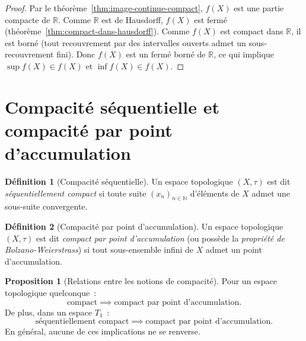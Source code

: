 \documentclass[12pt,a4paper,openany]{book}
\theoremstyle{definition}
\newtheorem{definition}{Définition}[chapter]
\theoremstyle{cours}
\newtheorem{proposition}[theoreme]{Proposition}
\theoremstyle{coursnormal}
\newcommand{\N}{\mathbb{N}}
\newcommand{\R}{\mathbb{R}}
\begin{document}
\begin{proof}
  Par le théorème~\ref{thm:image-continue-compact}, $f(X)$ est une partie
  compacte de $\R$. Comme $\R$ est de Hausdorff, $f(X)$ est fermé
  (théorème~\ref{thm:compact-dans-hausdorff}). Comme $f(X)$ est compact dans
  $\R$, il est borné (tout recouvrement par des intervalles ouverts admet un
  sous-recouvrement fini). Donc $f(X)$ est un fermé borné de $\R$, ce qui
  implique $\sup f(X)\in f(X)$ et $\inf f(X)\in f(X)$.
\end{proof}

\section{Compacité séquentielle et compacité par point
  d'accumulation}\label{sec:compact-sequentiel}

\begin{definition}[Compacité séquentielle]\label{def:compact-seq}
  Un espace topologique $(X,\tau)$ est dit \emph{séquentiellement
  compact} si toute suite $(x_n)_{n\in\N}$
  d'éléments de $X$ admet une sous-suite convergente.
\end{definition}

\begin{definition}[Compacité par point d'accumulation]\label{def:compact-accum}
  Un espace topologique $(X,\tau)$ est dit \emph{compact par point
  d'accumulation} (ou possède la
  \emph{propriété de Bolzano-Weierstrass}) si tout
  sous-ensemble infini de $X$ admet un point d'accumulation.
\end{definition}

\begin{proposition}[Relations entre les notions de compacité]\label{prop:relations-compacite}
  Pour un espace topologique quelconque~:
  \[
    \text{compact} \implies \text{compact par point d'accumulation}.
  \]
  De plus, dans un espace $T_1$~:
  \[
    \text{séquentiellement compact} \implies \text{compact par point d'accumulation}.
  \]
  En général, aucune de ces implications ne se renverse.
\end{proposition}
\end{document}
